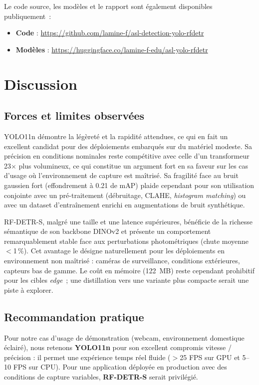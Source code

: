 \documentclass[conference]{IEEEtran}
\begin{document}
\noindent
Le code source, les modèles et le rapport sont également disponibles publiquement~:

\begin{itemize}\setlength\itemsep{2pt}
  \item \textbf{Code} : \url{https://github.com/lamine-f/asl-detection-yolo-rfdetr}
  \item \textbf{Modèles} : \url{https://huggingface.co/lamine-f-edu/asl-yolo-rfdetr}
\end{itemize}

\section{Discussion}

\subsection{Forces et limites observées}

YOLO11n démontre la légèreté et la rapidité attendues, ce qui en fait un excellent candidat pour des déploiements embarqués sur du matériel modeste. Sa précision en conditions nominales reste compétitive avec celle d'un transformeur 23$\times$ plus volumineux, ce qui constitue un argument fort en sa faveur sur les cas d'usage où l'environnement de capture est maîtrisé. Sa fragilité face au bruit gaussien fort (effondrement à 0.21 de mAP) plaide cependant pour son utilisation conjointe avec un pré-traitement (débruitage, CLAHE, \textit{histogram matching}) ou avec un dataset d'entraînement enrichi en augmentations de bruit synthétique.

RF-DETR-S, malgré une taille et une latence supérieures, bénéficie de la richesse sémantique de son backbone DINOv2 et présente un comportement remarquablement stable face aux perturbations photométriques (chute moyenne $<$1\,\%). Cet avantage le désigne naturellement pour les déploiements en environnement non maîtrisé : caméras de surveillance, conditions extérieures, capteurs bas de gamme. Le coût en mémoire (122~MB) reste cependant prohibitif pour les cibles \textit{edge}~; une distillation vers une variante plus compacte serait une piste à explorer.

\subsection{Recommandation pratique}

Pour notre cas d'usage de démonstration (webcam, environnement domestique éclairé), nous retenons \textbf{YOLO11n} pour son excellent compromis vitesse / précision : il permet une expérience temps réel fluide ($>$25 FPS sur GPU et 5--10 FPS sur CPU). Pour une application déployée en production avec des conditions de capture variables, \textbf{RF-DETR-S} serait privilégié.
\end{document}
